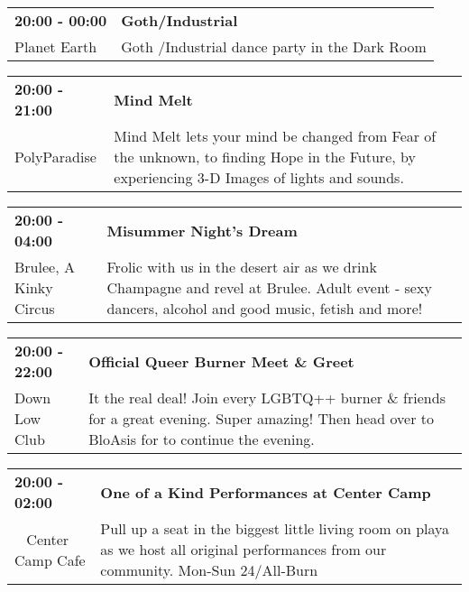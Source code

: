 \begin{tabular}{ p{1in} p{2.2in} }
    \textbf{20:00 - 00:00} & \textbf{Goth/Industrial} \\
    Planet Earth \newline  & Goth /Industrial dance party in the Dark Room \\
    \hline 
\end{tabular}
    
\begin{tabular}{ p{1in} p{2.2in} }
    \textbf{20:00 - 21:00} & \textbf{Mind Melt } \\
    PolyParadise \newline  & Mind Melt lets your mind be changed from Fear of the unknown, to finding Hope in the Future, by experiencing 3-D Images of lights and sounds. \\
    \hline 
\end{tabular}
    
\begin{tabular}{ p{1in} p{2.2in} }
    \textbf{20:00 - 04:00} & \textbf{Misummer Night's Dream} \\
    Brulee, A Kinky Circus \newline  & Frolic with us in the desert air as we drink Champagne and revel at Brulee. Adult event - sexy dancers, alcohol  and good music, fetish and more! \\
    \hline 
\end{tabular}
    
\begin{tabular}{ p{1in} p{2.2in} }
    \textbf{20:00 - 22:00} & \textbf{Official Queer Burner Meet \& Greet} \\
    Down Low Club \newline  & It the real deal! Join every LGBTQ++ burner \& friends for a great evening. Super amazing! Then head over to BloAsis for to continue the evening. \\
    \hline 
\end{tabular}
    
\begin{tabular}{ p{1in} p{2.2in} }
    \textbf{20:00 - 02:00} & \textbf{One of a Kind Performances at Center Camp} \\
    ~ \newline Center Camp Cafe & Pull up a seat in the biggest little living room on playa as we host all original performances from our community. Mon-Sun 24/All-Burn \\
    \hline 
\end{tabular}
    
